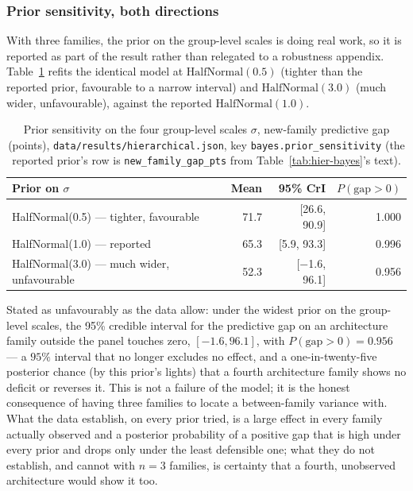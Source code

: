 \documentclass[11pt]{article}
\begin{document}
\subsubsection{Prior sensitivity, both directions}

With three families, the prior on the group-level scales is doing real work,
so it is reported as part of the result rather than relegated to a robustness
appendix. Table~\ref{tab:hier-prior} refits the identical model at
$\mathrm{HalfNormal}(0.5)$ (tighter than the reported prior, favourable to a
narrow interval) and $\mathrm{HalfNormal}(3.0)$ (much wider, unfavourable),
against the reported $\mathrm{HalfNormal}(1.0)$.

\begin{table}[h]
\centering
\caption{Prior sensitivity on the four group-level scales $\sigma$,
new-family predictive gap (points), \texttt{data/results/hierarchical.json},
key \texttt{bayes.prior\_sensitivity} (the reported prior's row is
\texttt{new\_family\_gap\_pts} from Table~\ref{tab:hier-bayes}'s text).}
\label{tab:hier-prior}
\small
\begin{tabular}{@{}lrrr@{}}
\toprule
Prior on $\sigma$ & Mean & 95\% CrI & $P(\mathrm{gap}>0)$ \\
\midrule
HalfNormal(0.5) --- tighter, favourable & 71.7 & [26.6, 90.9] & 1.000 \\
HalfNormal(1.0) --- reported & 65.3 & [5.9, 93.3] & 0.996 \\
HalfNormal(3.0) --- much wider, unfavourable & 52.3 & [$-$1.6, 96.1] & 0.956 \\
\bottomrule
\end{tabular}
\end{table}

Stated as unfavourably as the data allow: under the widest prior on the
group-level scales, the 95\% credible interval for the predictive gap on an
architecture family outside the panel touches zero, $[-1.6, 96.1]$, with
$P(\mathrm{gap}>0)=0.956$ --- a $95\%$ interval that no longer excludes no
effect, and a one-in-twenty-five posterior chance (by this prior's lights) that
a fourth architecture family shows no deficit or reverses it. This is not a
failure of the model; it is the honest consequence of having three families to
locate a between-family variance with. What the data establish, on every prior
tried, is a large effect in every family actually observed and a posterior
probability of a positive gap that is high under every prior and drops only
under the least defensible one; what they do not establish, and cannot with
$n=3$ families, is certainty that a fourth, unobserved architecture would show
it too.
\end{document}
